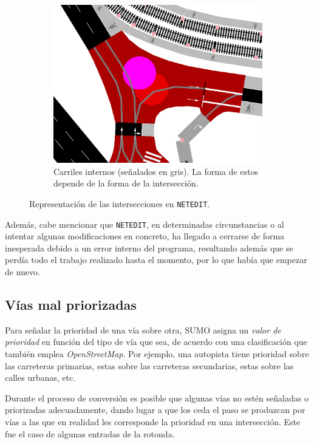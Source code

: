 \begin{figure}[ht]
\begin{subfigure}[t]{.30\textwidth}
    \end{subfigure}%
    \hfill
    \begin{subfigure}[t]{.30\textwidth}
      \centering
      \includegraphics[width=\textwidth]{report/images/interseccion3.png}
      \caption{Carriles internos (señalados en gris). La forma de estos depende de la forma de la intersección.}
      \label{fig:interseccion3}
    \end{subfigure}
    \caption{Representación de las intersecciones en \texttt{NETEDIT}.}
    \label{fig:interseccion}
\end{figure}

Además, cabe mencionar que \texttt{NETEDIT}, en determinadas circunstancias o al intentar algunas modificaciones en concreto, ha llegado a cerrarse de forma inesperada debido a un error interno del programa, resultando además que se perdía todo el trabajo realizado hasta el momento, por lo que había que empezar de nuevo.

\subsection{Vías mal priorizadas}

Para señalar la prioridad de una vía sobre otra, SUMO asigna un \textit{valor de prioridad} en función del tipo de vía que sea, de acuerdo con una clasificación que también emplea \textit{OpenStreetMap}. Por ejemplo, una autopista tiene prioridad sobre las carreteras primarias, estas sobre las carreteras secundarias, estas sobre las calles urbanas, etc. 

Durante el proceso de conversión es posible que algunas vías no estén señaladas o priorizadas adecuadamente, dando lugar a que los ceda el paso se produzcan por vías a las que en realidad les corresponde la prioridad en una intersección. Este fue el caso de algunas entradas de la rotonda.

